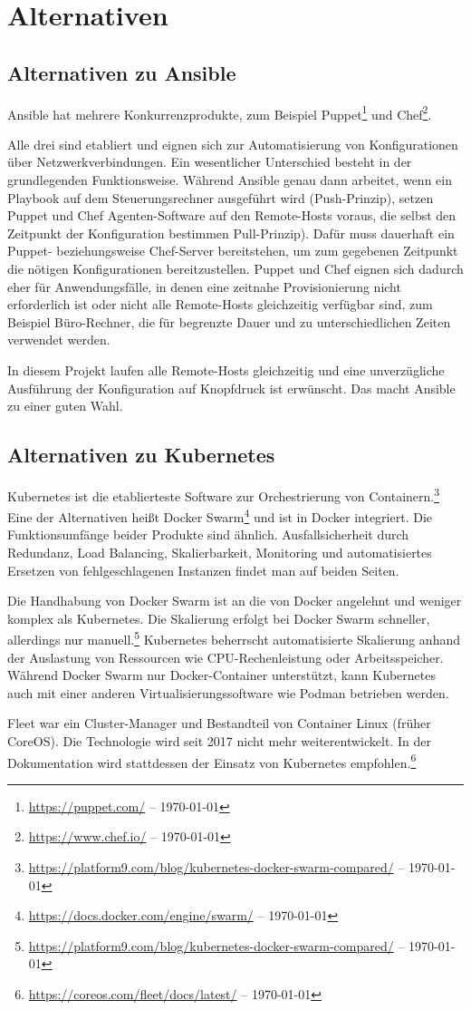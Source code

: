 \chapter{Alternativen}\label{ch:alternativen}
\section{Alternativen zu Ansible}\label{sec:ansible-alternativen}

Ansible hat mehrere Konkurrenzprodukte, zum Beispiel Puppet\footnote{\url{https://puppet.com/} -- \today} und Chef\footnote{\url{https://www.chef.io/} -- \today}.

Alle drei sind etabliert und eignen sich zur Automatisierung von Konfigurationen über Netzwerkverbindungen.
Ein wesentlicher Unterschied besteht in der grundlegenden Funktionsweise.
Während Ansible genau dann arbeitet, wenn ein Playbook auf dem Steuerungsrechner ausgeführt wird (Push-Prinzip), setzen Puppet und Chef Agenten-Software auf den Remote-Hosts voraus, die selbst den Zeitpunkt der Konfiguration bestimmen Pull-Prinzip).
Dafür muss dauerhaft ein Puppet- beziehungsweise Chef-Server bereitstehen, um zum gegebenen Zeitpunkt die nötigen Konfigurationen bereitzustellen.
Puppet und Chef eignen sich dadurch eher für Anwendungsfälle, in denen eine zeitnahe Provisionierung nicht erforderlich ist oder nicht alle Remote-Hosts gleichzeitig verfügbar sind, zum Beispiel Büro-Rechner, die für begrenzte Dauer und zu unterschiedlichen Zeiten verwendet werden.

In diesem Projekt laufen alle Remote-Hosts gleichzeitig und eine unverzügliche Ausführung der Konfiguration auf Knopfdruck ist erwünscht.
Das macht Ansible zu einer guten Wahl.

\section{Alternativen zu Kubernetes}\label{sec:kubernetes-alternativen}
Kubernetes ist die etablierteste Software zur Orchestrierung von Containern.\footnote{\url{https://platform9.com/blog/kubernetes-docker-swarm-compared/} -- \today}
Eine der Alternativen heißt Docker Swarm\footnote{\url{https://docs.docker.com/engine/swarm/} -- \today} und ist in Docker integriert.
Die Funktionsumfänge beider Produkte sind ähnlich.
Ausfallsicherheit durch Redundanz, Load Balancing, Skalierbarkeit, Monitoring und automatisiertes Ersetzen von fehlgeschlagenen Instanzen findet man auf beiden Seiten.

Die Handhabung von Docker Swarm ist an die von Docker angelehnt und weniger komplex als Kubernetes.
Die Skalierung erfolgt bei Docker Swarm schneller, allerdings nur manuell.\footnote{\url{https://platform9.com/blog/kubernetes-docker-swarm-compared/} -- \today}
Kubernetes beherrscht automatisierte Skalierung anhand der Auslastung von Ressourcen wie CPU-Rechenleistung oder Arbeitsspeicher.
Während Docker Swarm nur Docker-Container unterstützt, kann Kubernetes auch mit einer anderen Virtualisierungssoftware wie Podman betrieben werden.

Fleet war ein Cluster-Manager und Bestandteil von Container Linux (früher CoreOS).
Die Technologie wird seit 2017 nicht mehr weiterentwickelt.
In der Dokumentation wird stattdessen der Einsatz von Kubernetes empfohlen.\footnote{\url{https://coreos.com/fleet/docs/latest/} -- \today}
